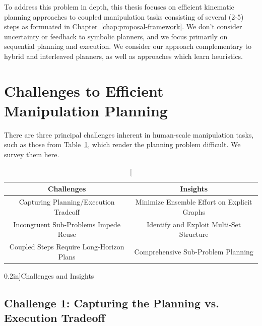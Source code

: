 To address this problem in depth,
this thesis focuses on
efficient kinematic planning approaches
to coupled manipulation tasks consisting of several (2-5) steps
as formuated in Chapter~\ref{chap:proposal-framework}.
We don't consider uncertainty
or feedback to symbolic planners,
and we focus primarily on sequential planning and execution.
We consider our approach complementary to
hybrid and interleaved planners,
as well as approaches which learn heuristics.

\section*{Challenges to Efficient Manipulation Planning}

There are three principal challenges inherent in
human-scale manipulation tasks,
such as those from Table~\ref{tab:challenges-insights},
which render the planning problem difficult.
We survey them here.

\begin{table}[t]
   \centering
   \begin{tabular}{cc}
      \toprule
      Challenges & Insights \\
      \midrule
      Capturing Planning/Execution Tradeoff
         & Minimize Ensemble Effort on Explicit Graphs \\
      Incongruent Sub-Problems Impede Reuse
         & Identify and Exploit Multi-Set Structure \\
      Coupled Steps Require Long-Horizon Plans
         & Comprehensive Sub-Problem Planning \\
      \bottomrule
   \end{tabular}
   \caption[][0.2in]{Challenges and Insights}
   \label{tab:challenges-insights}
\end{table}

\subsection*{Challenge 1:
   Capturing the Planning vs. Execution Tradeoff}

